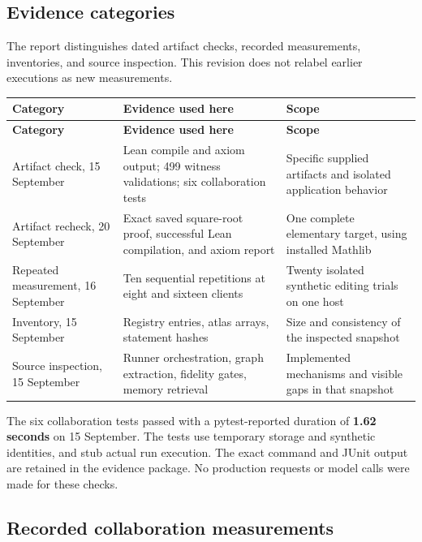 \documentclass[10pt,letterpaper]{article}
\begin{document}
\subsection{Evidence categories}

The report distinguishes dated artifact checks, recorded measurements, inventories, and source inspection. This revision does not relabel earlier executions as new measurements.

\begingroup\small
\setlength{\tabcolsep}{4pt}
\begin{longtable}{>{\raggedright\arraybackslash}p{0.23\dimexpr\linewidth-6\tabcolsep\relax}>{\raggedright\arraybackslash}p{0.38\dimexpr\linewidth-6\tabcolsep\relax}>{\raggedright\arraybackslash}p{0.39\dimexpr\linewidth-6\tabcolsep\relax}}
\toprule
\textbf{Category} & \textbf{Evidence used here} & \textbf{Scope} \\
\midrule\endfirsthead
\toprule
\textbf{Category} & \textbf{Evidence used here} & \textbf{Scope} \\
\midrule\endhead
\bottomrule\endfoot
Artifact check, 15 September & Lean compile and axiom output; 499 witness validations; six collaboration tests & Specific supplied artifacts and isolated application behavior \\
Artifact recheck, 20 September & Exact saved square-root proof, successful Lean compilation, and axiom report & One complete elementary target, using installed Mathlib \\
Repeated measurement, 16 September & Ten sequential repetitions at eight and sixteen clients & Twenty isolated synthetic editing trials on one host \\
Inventory, 15 September & Registry entries, atlas arrays, statement hashes & Size and consistency of the inspected snapshot \\
Source inspection, 15 September & Runner orchestration, graph extraction, fidelity gates, memory retrieval & Implemented mechanisms and visible gaps in that snapshot \\
\end{longtable}
\endgroup

The six collaboration tests passed with a pytest-reported duration of \textbf{1.62 seconds} on 15 September. The tests use temporary storage and synthetic identities, and stub actual run execution. The exact command and JUnit output are retained in the evidence package. No production requests or model calls were made for these checks.

\subsection{Recorded collaboration measurements}
\end{document}
